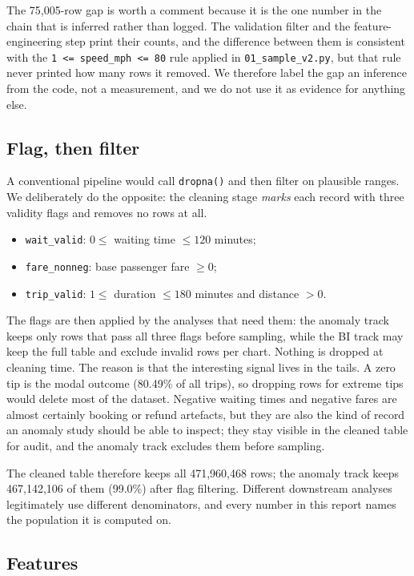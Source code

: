 \documentclass[11pt,a4paper]{article}
\newcommand{\code}[1]{\texttt{\small #1}}
\begin{document}
The 75{,}005-row gap is worth a comment because it is the one number in the chain that is inferred rather than logged. The validation filter and the feature-engineering step print their counts, and the difference between them is consistent with the \code{1 <= speed\_mph <= 80} rule applied in \code{01\_sample\_v2.py}, but that rule never printed how many rows it removed. We therefore label the gap an inference from the code, not a measurement, and we do not use it as evidence for anything else.

\subsection{Flag, then filter}

A conventional pipeline would call \code{dropna()} and then filter on plausible ranges. We deliberately do the opposite: the cleaning stage \emph{marks} each record with three validity flags and removes no rows at all.

\begin{itemize}
\item \code{wait\_valid}: $0 \le$ waiting time $\le 120$ minutes;
\item \code{fare\_nonneg}: base passenger fare $\ge 0$;
\item \code{trip\_valid}: $1 \le$ duration $\le 180$ minutes and distance $> 0$.
\end{itemize}

The flags are then applied by the analyses that need them: the anomaly track keeps only rows that pass all three flags before sampling, while the BI track may keep the full table and exclude invalid rows per chart. Nothing is dropped at cleaning time. The reason is that the interesting signal lives in the tails. A zero tip is the modal outcome (80.49\% of all trips), so dropping rows for extreme tips would delete most of the dataset. Negative waiting times and negative fares are almost certainly booking or refund artefacts, but they are also the kind of record an anomaly study should be able to inspect; they stay visible in the cleaned table for audit, and the anomaly track excludes them before sampling.

The cleaned table therefore keeps all 471{,}960{,}468 rows; the anomaly track keeps 467{,}142{,}106 of them (99.0\%) after flag filtering. Different downstream analyses legitimately use different denominators, and every number in this report names the population it is computed on.

\subsection{Features}
\end{document}

